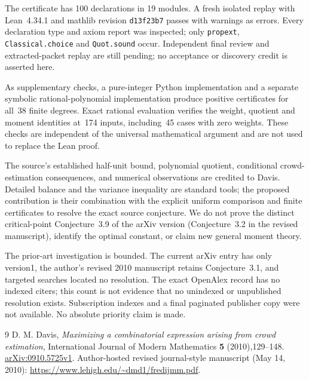 \documentclass[11pt]{article}
\begin{document}
The certificate has 100 declarations in 19 modules. A fresh isolated replay
with Lean~4.34.1 and mathlib revision \texttt{d13f23b7} passes with
warnings as errors. Every declaration type and axiom report was inspected;
only \texttt{propext}, \texttt{Classical.choice} and \texttt{Quot.sound}
occur. Independent final review and extracted-packet replay are still
pending; no acceptance or discovery credit is asserted here.

As supplementary checks, a pure-integer Python implementation and a
separate symbolic rational-polynomial implementation produce positive
certificates for all~38 finite degrees. Exact rational evaluation verifies
the weight, quotient and moment identities at~174 inputs, including~45
cases with zero weights. These checks are independent of the universal
mathematical argument and are not used to replace the Lean proof.

The source's established half-unit bound, polynomial quotient,
conditional crowd-estimation consequences, and numerical observations
are credited to Davis. Detailed balance and the variance inequality are
standard tools; the proposed contribution is their combination with the
explicit uniform comparison and finite certificates to resolve the exact
source conjecture. We do not prove the distinct critical-point
Conjecture~3.9 of the arXiv version (Conjecture~3.2 in the revised
manuscript), identify the optimal constant, or claim new general
moment theory.

The prior-art investigation is bounded. The current arXiv entry has
only version1, the author's revised 2010 manuscript retains Conjecture~3.1,
and targeted searches located no resolution. The exact OpenAlex record
has no indexed citers; this count is not evidence that no unindexed or
unpublished resolution exists. Subscription indexes and a final paginated
publisher copy were not available. No absolute priority claim is made.

\begin{thebibliography}{9}
 D. M. Davis, \emph{Maximizing a combinatorial expression
arising from crowd estimation}, International Journal of Modern
Mathematics \textbf{5} (2010),129--148.
\href{https://arxiv.org/abs/0910.5725v1}{arXiv:0910.5725v1}.
Author-hosted revised journal-style manuscript (May 14, 2010):
\url{https://www.lehigh.edu/~dmd1/fredijmm.pdf}.
\end{thebibliography}
\end{document}
